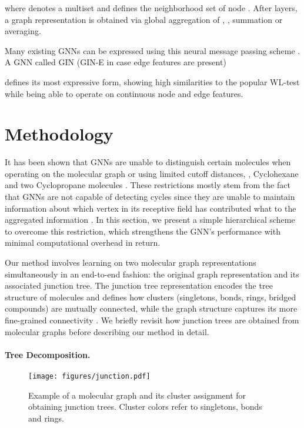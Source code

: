 \documentclass{article}
\begin{document}
where  denotes a multiset and  defines the neighborhood set of node  \citep{Gilmer/etal/2017}.
After  layers, a graph representation is obtained via global aggregation of , \eg, summation or averaging.

Many existing GNNs can be expressed using this neural message passing scheme \citep{Kipf/Welling/2017,Velickovic/etal/2018}.
A GNN called \textsc{GIN} (\textsc{GIN-E} in case edge features are present) \citep{Xu/etal/2019,Hu/etal/2020a}

defines its most expressive form, showing high similarities to the popular WL-test \citep{Weisfeiler/Lehman/1968} while being able to operate on continuous node and edge features.

\section{Methodology}\label{sec:methodology}

It has been shown that GNNs are unable to distinguish certain molecules when operating on the molecular graph or using limited cutoff distances, \eg, Cyclohexane and two Cyclopropane molecules \citep{Xu/etal/2019,Klicpera/etal/2020}.
These restrictions mostly stem from the fact that GNNs are not capable of detecting cycles \citep{Loukas/2020} since they are unable to maintain information about which vertex in its receptive field has contributed what to the aggregated information \citep{Hy/etal/2018}.
In this section, we present a simple hierarchical scheme to overcome this restriction, which strengthens the GNN's performance with minimal computational overhead in return.

Our method involves learning on two molecular graph representations simultaneously in an end-to-end fashion: the original graph representation and its associated junction tree.
The junction tree representation encodes the tree structure of molecules and defines how clusters (singletons, bonds, rings, bridged compounds) are mutually connected, while the graph structure captures its more fine-grained connectivity \citep{Jin/etal/2018}.
We briefly revisit how junction trees are obtained from molecular graphs before describing our method in detail.

\paragraph{Tree Decomposition.}\label{par:tree_decomposition}

\begin{figure}[t]
  \centering
  \texttt{[image: figures/junction.pdf]}
  \caption{Example of a molecular graph and its cluster assignment for obtaining junction trees.
    Cluster colors refer to \textcolor{orange}{} singletons, \textcolor{blue}{} bonds and \textcolor{green}{} rings.
  }\label{fig:junction}
\end{figure}
\end{document}
